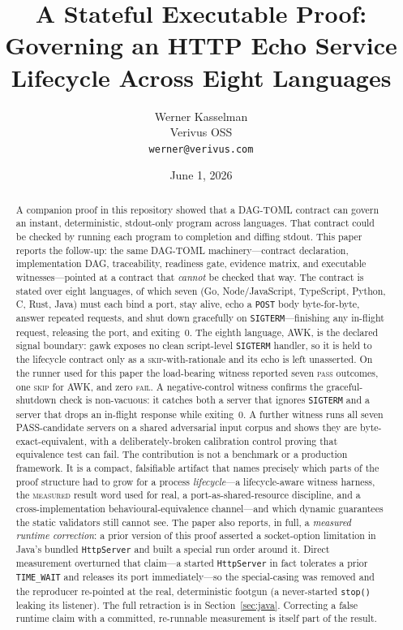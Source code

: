 \documentclass[11pt,letterpaper]{article}
\title{\bfseries A Stateful Executable Proof: Governing an HTTP Echo
Service Lifecycle Across Eight Languages}
\author{Werner Kasselman\\Verivus OSS\\\texttt{werner@verivus.com}}
\date{June 1, 2026}
\newcommand{\dagtoml}{DAG-TOML}
\newcommand{\measured}{\textsc{measured}}
\begin{document}
\maketitle

\begin{abstract}
A companion proof in this repository showed that a \dagtoml{} contract
can govern an instant, deterministic, stdout-only program across
languages. That contract could be checked by running each program to
completion and diffing stdout. This paper reports the follow-up: the
same \dagtoml{} machinery---contract declaration, implementation DAG,
traceability, readiness gate, evidence matrix, and executable
witnesses---pointed at a contract that \emph{cannot} be checked that
way. The contract is stated over eight languages, of which seven
(Go, Node/JavaScript, TypeScript, Python, C, Rust, Java) must each bind
a port, stay alive, echo a \texttt{POST} body byte-for-byte, answer
repeated requests, and shut down gracefully on
\texttt{SIGTERM}---finishing any in-flight request, releasing the port,
and exiting~0. The eighth language, AWK, is the declared signal boundary:
gawk exposes no clean script-level \texttt{SIGTERM} handler, so it is
held to the lifecycle contract only as a \textsc{skip}-with-rationale and
its echo is left unasserted. On the runner used for this paper the
load-bearing witness reported seven \textsc{pass} outcomes, one
\textsc{skip} for AWK, and zero \textsc{fail}. A negative-control witness confirms the graceful-shutdown
check is non-vacuous: it catches both a server that ignores
\texttt{SIGTERM} and a server that drops an in-flight response while
exiting~0. A further witness runs all seven PASS-candidate servers on a
shared adversarial input corpus and shows they are byte-exact-equivalent,
with a deliberately-broken calibration control proving that
equivalence test can fail. The contribution is not a benchmark or a
production framework. It is a compact, falsifiable artifact that names
precisely which parts of the proof structure had to grow for a process
\emph{lifecycle}---a lifecycle-aware witness harness, the \measured{}
result word used for real, a port-as-shared-resource discipline, and a
cross-implementation behavioural-equivalence channel---and which dynamic
guarantees the static validators still cannot see. The paper also reports,
in full, a \emph{measured runtime correction}: a prior version of this
proof asserted a socket-option limitation in Java's bundled
\texttt{HttpServer} and built a special run order around it. Direct
measurement overturned that claim---a started \texttt{HttpServer} in fact
tolerates a prior \texttt{TIME\_WAIT} and releases its port immediately---so
the special-casing was removed and the reproducer re-pointed at the real,
deterministic footgun (a never-started \texttt{stop()} leaking its
listener). The full retraction is in Section~\ref{sec:java}. Correcting a
false runtime claim with a committed, re-runnable measurement is itself
part of the result.
\end{abstract}
\end{document}
